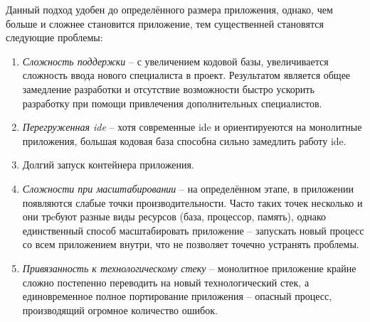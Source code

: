 Данный подход удобен до определённого размера приложения, однако, чем больше и сложнее становится приложение, тем существенней становятся следующие проблемы:

\begin{enumerate}
	\item \emph{Сложность поддержки} -- с увеличением кодовой базы, увеличивается сложность ввода нового специалиста в проект. Результатом является общее замедление разработки и отсутствие возможности быстро ускорить разработку при помощи привлечения дополнительных специалистов.
	\item \emph{Перегруженная \gls{ide}} -- хотя современные \gls{ide} и ориентируеются на монолитные приложения, большая кодовая база способна сильно замедлить работу \gls{ide}.
	\item Долгий запуск контейнера приложения.
	\item \emph{Сложности при масштабировании} -- на определённом этапе, в приложении появляются слабые точки производительности. Часто таких точек несколько и они трeбуют разные виды ресурсов (база, процессор, память), однако единственный способ масштабировать приложение -- запускать новый процесс со всем приложением внутри, что не позволяет точечно устранять проблемы.
	\item \emph{Привязанность к технологическому стеку} -- монолитное приложение крайне сложно постепенно переводить на новый технологический стек, а единовременное полное портирование приложения -- опасный процесс, производящий огромное количество ошибок.
\end{enumerate}